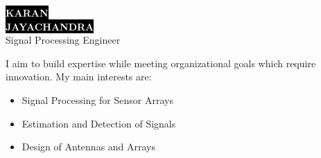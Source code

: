 \documentclass[9pt]{developercv} %
\begin{document}

\begin{minipage}[t]{0.35\textwidth}
	\vspace{-\baselineskip}
	\colorbox{black}{{\Huge\textcolor{white}{\textbf{\MakeUppercase{Karan}}}}} \\
	\colorbox{black}{{\Huge\textcolor{white}{\textbf{\MakeUppercase{Jayachandra}}}}} \\
	\vspace{20pt}
	{\Large Signal Processing Engineer}
\end{minipage}
\hfill
\begin{minipage}[t]{0.30\textwidth}
	\vspace{-\baselineskip}
	
\end{minipage}
\hfill
\begin{minipage}[t]{0.25\textwidth}
	\vspace{-\baselineskip}

\end{minipage}

\vspace{0.5cm}



\begin{minipage}[t]{0.5\textwidth}
	\vspace{-\baselineskip}
	I aim to build expertise while meeting organizational goals which require innovation. My main interests are: 
	\begin{itemize}
		\item Signal Processing for Sensor Arrays
		\item Estimation and Detection of Signals
		\item Design of Antennas and Arrays
	\end{itemize}
\end{minipage}
\hfill
\begin{minipage}[t]{0.4\textwidth}
	\vspace{-\baselineskip}
	\begin{barchart}{3}
	\end{barchart}
\end{minipage}
\end{document}
